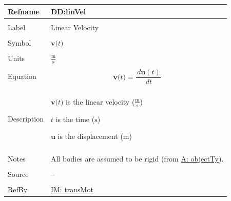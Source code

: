\documentclass[12pt]{article}
\begin{document}
\vspace{\baselineskip}
\noindent
\begin{minipage}{\textwidth}
\begin{tabular}{>{\raggedright}p{}>{\raggedright\arraybackslash}p{}}
\toprule \textbf{Refname} & \textbf{DD:linVel}
\label{DD:linVel}
\\ \midrule \\
Label & Linear Velocity
        
\\ \midrule \\
Symbol & $\mathbf{v}\text{(}t\text{)}$
         
\\ \midrule \\
Units & $\frac{\text{m}}{\text{s}}$
        
\\ \midrule \\
Equation & \begin{displaymath}
           \mathbf{v}\text{(}t\text{)}=\frac{\,d\mathbf{u}\left(t\right)}{\,dt}
           \end{displaymath}
\\ \midrule \\
Description & \begin{symbDescription}
              \item{$\mathbf{v}\text{(}t\text{)}$ is the linear velocity ($\frac{\text{m}}{\text{s}}$)}
              \item{$t$ is the time (${\text{s}}$)}
              \item{$\mathbf{u}$ is the displacement (${\text{m}}$)}
              \end{symbDescription}
\\ \midrule \\
Notes & All bodies are assumed to be rigid (from \hyperref[assumpOT]{A: objectTy}).
        
\\ \midrule \\
Source & --
         
\\ \midrule \\
RefBy & \hyperref[IM:transMot]{IM: transMot}
        
\\ \bottomrule
\end{tabular}
\end{minipage}
\end{document}
